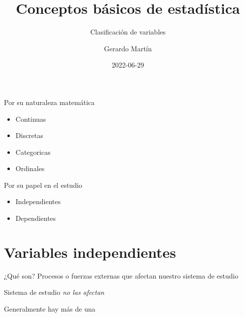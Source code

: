 \documentclass[
  11pt,
  ignorenonframetext,
]{beamer}
\title{Conceptos básicos de estadística}
\subtitle{Clasificación de variables}
\author{Gerardo Martín}
\date{2022-06-29}
\begin{document}
\frame{\titlepage}

\begin{frame}{Por su naturaleza matemática}
\protect\hypertarget{por-su-naturaleza-matemuxe1tica}{}
\begin{itemize}
\item
  Continuas
\item
  Discretas
\item
  Categoricas
\item
  Ordinales
\end{itemize}
\end{frame}

\begin{frame}{Por su papel en el estudio}
\protect\hypertarget{por-su-papel-en-el-estudio}{}
\begin{itemize}
\item
  Independientes
\item
  Dependientes
\end{itemize}
\end{frame}

\hypertarget{variables-independientes}{%
\section{Variables independientes}\label{variables-independientes}}

\begin{frame}{¿Qué son?}
\protect\hypertarget{quuxe9-son}{}
Procesos o fuerzas externas que afectan nuestro sistema de estudio

Sistema de estudio \emph{no las afectan}

Generalmente hay más de una
\end{frame}
\end{document}
